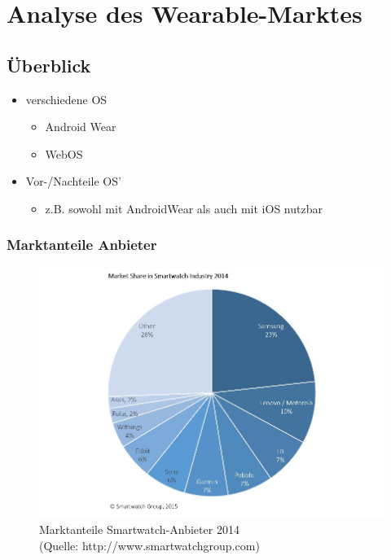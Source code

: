 \section{Analyse des Wearable-Marktes}
\subsection{Überblick}
	\begin{itemize}
		\item verschiedene OS
			\begin{itemize}
				\item Android Wear
				\item WebOS
			\end{itemize}
		\item Vor-/Nachteile OS'
			\begin{itemize}
				\item z.B. sowohl mit AndroidWear als auch mit iOS nutzbar
			\end{itemize}
	\end{itemize}

\subsubsection{Marktanteile Anbieter}
\begin{figure}[h!]
	\includegraphics{images/Market_Share_Smartwatch_Companies_2014}
	\caption[Marktanteile Smartwatch-Anbieter 2014]{Marktanteile Smartwatch-Anbieter 2014\\\hspace{\textwidth}(Quelle: http://www.smartwatchgroup.com)}
\end{figure}

